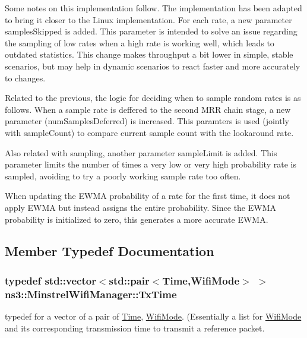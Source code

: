 Some notes on this implementation follow. The implementation has been adapted to bring it closer to the Linux implementation. For each rate, a new parameter samples\+Skipped is added. This parameter is intended to solve an issue regarding the sampling of low rates when a high rate is working well, which leads to outdated statistics. This change makes throughput a bit lower in simple, stable scenarios, but may help in dynamic scenarios to react faster and more accurately to changes.

Related to the previous, the logic for deciding when to sample random rates is as follows. When a sample rate is deffered to the second M\+RR chain stage, a new parameter (num\+Samples\+Deferred) is increased. This paramters is used (jointly with sample\+Count) to compare current sample count with the lookaround rate.

Also related with sampling, another parameter sample\+Limit is added. This parameter limits the number of times a very low or very high probability rate is sampled, avoiding to try a poorly working sample rate too often.

When updating the E\+W\+MA probability of a rate for the first time, it does not apply E\+W\+MA but instead assigns the entire probability. Since the E\+W\+MA probability is initialized to zero, this generates a more accurate E\+W\+MA. 

\subsection{Member Typedef Documentation}
\subsubsection[{\texorpdfstring{Tx\+Time}{TxTime}}]{\setlength{\rightskip}{0pt plus 5cm}typedef std\+::vector$<$std\+::pair$<${\bf Time},{\bf Wifi\+Mode}$>$ $>$ {\bf ns3\+::\+Minstrel\+Wifi\+Manager\+::\+Tx\+Time}\hspace{0.3cm}{\ttfamily [private]}}\hypertarget{classns3_1_1MinstrelWifiManager_a6130b5465b4427d329230812377e661c}{}\label{classns3_1_1MinstrelWifiManager_a6130b5465b4427d329230812377e661c}
typedef for a vector of a pair of \hyperlink{classns3_1_1Time}{Time}, \hyperlink{classns3_1_1WifiMode}{Wifi\+Mode}. (Essentially a list for \hyperlink{classns3_1_1WifiMode}{Wifi\+Mode} and its corresponding transmission time to transmit a reference packet. 

